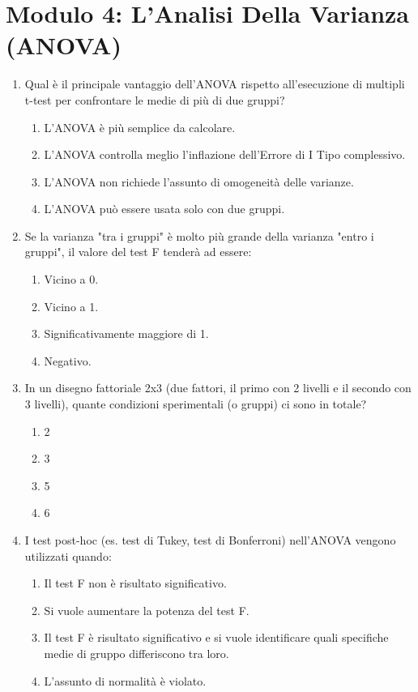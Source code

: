 \documentclass[12pt, a4paper]{article}
\begin{document}
\section*{Modulo 4: L'Analisi Della Varianza (ANOVA)}
\begin{enumerate}[resume]
    \item Qual è il principale vantaggio dell'ANOVA rispetto all'esecuzione di multipli t-test per confrontare le medie di più di due gruppi?
    \begin{enumerate}
        \item L'ANOVA è più semplice da calcolare.
        \item L'ANOVA controlla meglio l'inflazione dell'Errore di I Tipo complessivo.
        \item L'ANOVA non richiede l'assunto di omogeneità delle varianze.
        \item L'ANOVA può essere usata solo con due gruppi.
    \end{enumerate}
    \vspace{0.3cm}

    \item Se la varianza "tra i gruppi" è molto più grande della varianza "entro i gruppi", il valore del test F tenderà ad essere:
    \begin{enumerate}
        \item Vicino a 0.
        \item Vicino a 1.
        \item Significativamente maggiore di 1.
        \item Negativo.
    \end{enumerate}
    \vspace{0.3cm}

    \item In un disegno fattoriale 2x3 (due fattori, il primo con 2 livelli e il secondo con 3 livelli), quante condizioni sperimentali (o gruppi) ci sono in totale?
    \begin{enumerate}
        \item 2
        \item 3
        \item 5
        \item 6
    \end{enumerate}
    \vspace{0.3cm}

    \item I test post-hoc (es. test di Tukey, test di Bonferroni) nell'ANOVA vengono utilizzati quando:
    \begin{enumerate}
        \item Il test F non è risultato significativo.
        \item Si vuole aumentare la potenza del test F.
        \item Il test F è risultato significativo e si vuole identificare quali specifiche medie di gruppo differiscono tra loro.
        \item L'assunto di normalità è violato.
    \end{enumerate}
    \vspace{0.3cm}


\end{enumerate}
\end{document}
